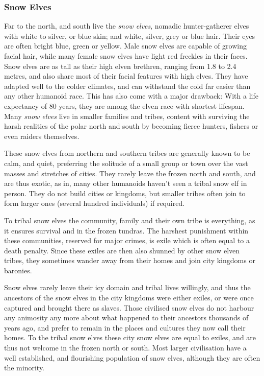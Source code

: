 \subsubsection{Snow Elves}
\label{sec:Snow Elves}


Far to the north, and south live the \emph{snow elves}, nomadic hunter-gatherer
elves with white to silver, or blue skin; and white, silver, grey or blue
hair. Their eyes are often bright blue, green or yellow. Male snow elves are
capable of growing facial hair, while many female snow elves have light red
freckles in their faces. Snow elves are as tall as their high elven brethren,
ranging from 1.8 to 2.4 metres, and also share most of their facial features
with high elves. They have adapted well to the colder climates, and can
withstand the cold far easier than any other humanoid race. This has also come
with a major drawback: With a life expectancy of 80 years, they are among the
elven race with shortest lifespan. Many \emph{snow elves} live in smaller
families and tribes, content with surviving the harsh realities of the polar
north and south by becoming fierce hunters, fishers or even raiders
themselves.

These snow elves from northern and southern tribes are generally known to be
calm, and quiet, preferring the solitude of a small group or town over the
vast masses and stretches of cities. They rarely leave the frozen north and
south, and are thus exotic, as in, many other humanoids haven't seen a tribal
snow elf in person. They do not build cities or kingdoms, but smaller tribes
often join to form larger ones (several hundred individuals) if required.

To tribal snow elves the community, family and their own tribe is everything, as
it ensures survival and in the frozen tundras. The harshest punishment within
these communities, reserved for major crimes, is exile which is often equal to
a death penalty. Since these exiles are then also shunned by other snow elven
tribes, they sometimes wander away from their homes and join city kingdoms or
baronies.

Snow elves rarely leave their icy domain and tribal lives willingly, and thus
the ancestors of the snow elves in the city kingdoms were either exiles, or
were once captured and brought there as slaves. Those civilised snow elves do
not harbour any animosity any more about what happened to their ancestors
thousands of years ago, and prefer to remain in the places and cultures they
now call their homes. To the tribal snow elves these city snow elves are equal
to exiles, and are thus not welcome in the frozen north or south. Most larger
civilisation have a well established, and flourishing population of snow elves,
although they are often the minority.

